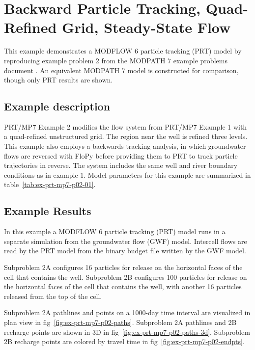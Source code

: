 \section{Backward Particle Tracking, Quad-Refined Grid, Steady-State Flow}

This example demonstrates a MODFLOW 6 particle tracking (PRT) model by reproducing example problem 2 from the MODPATH 7 \citep{pollock2016modpath7} example problems document \citep{modpath7examples}. An equivalent MODPATH 7 model is constructed for comparison, though only PRT results are shown.

\subsection{Example description}

PRT/MP7 Example 2 modifies the flow system from PRT/MP7 Example 1 with a quad-refined unstructured grid. The region near the well is refined three levels. This example also employs a backwards tracking analysis, in which groundwater flows are reversed with FloPy before providing them to PRT to track particle trajectories in reverse. The system includes the same well and river boundary conditions as in example 1. Model parameters for this example are summarized in table~\ref{tab:ex-prt-mp7-p02-01}.



\subsection{Example Results}

In this example a MODFLOW 6 particle tracking (PRT) model runs in a separate simulation from the groundwater flow (GWF) model. Intercell flows are read by the PRT model from the binary budget file written by the GWF model.

Subproblem 2A configures 16 particles for release on the horizontal faces of the cell that contains the well. Subproblem 2B configures 100 particles for release on the horizontal faces of the cell that contains the well, with another 16 particles released from the top of the cell.

Subproblem 2A pathlines and points on a 1000-day time interval are visualized in plan view in fig~\ref{fig:ex-prt-mp7-p02-paths}. Subproblem 2A pathlines and 2B recharge points are shown in 3D in fig~\ref{fig:ex-prt-mp7-p02-paths-3d}. Subproblem 2B recharge points are colored by travel time in fig~\ref{fig:ex-prt-mp7-p02-endpts}.

